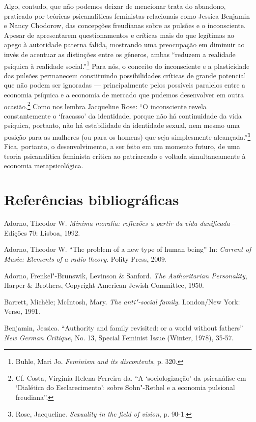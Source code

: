 Algo, contudo, que não podemos deixar de mencionar trata do abandono,
praticado por teóricas psicanalíticas feministas relacionais como
Jessica Benjamin e Nancy Chodorow, das concepções freudianas sobre as
pulsões e o inconsciente. Apesar de apresentarem questionamentos e
críticas mais do que legítimas ao apego à autoridade paterna falida,
mostrando uma preocupação em diminuir ao invés de acentuar as distinções
entre os gêneros, ambas ``reduzem a realidade psíquica à realidade
social.''\footnote{Buhle, Mari Jo. \emph{Feminism and its discontents},
  p. 320.} Para nós, o conceito do inconsciente e a plasticidade das
pulsões permanecem constituindo possibilidades críticas de grande
potencial que não podem ser ignoradas --- principalmente pelos possíveis
paralelos entre a economia psíquica e a economia de mercado que pudemos
desenvolver em outra ocasião.\footnote{Cf. Costa, Virginia Helena
  Ferreira da. ``A `sociologização' da psicanálise em `Dialética do
  Esclarecimento': sobre Sohn"-Rethel e a economia pulsional freudiana''.}
Como nos lembra Jacqueline Rose: ``O inconsciente revela constantemente
o `fracasso' da identidade, porque não há continuidade da vida psíquica,
portanto, não há estabilidade da identidade sexual, nem mesmo uma
posição para as mulheres (ou para os homens) que seja simplesmente
alcançada.''\footnote{Rose, Jacqueline. \emph{Sexuality in the field of
  vision}, p. 90-1.} Fica, portanto, o desenvolvimento, a ser feito em
um momento futuro, de uma teoria psicanalítica feminista crítica ao
patriarcado e voltada simultaneamente à economia metapsicológica.

\section{Referências bibliográficas}

Adorno, Theodor W. \emph{Minima
moralia: reflexões a partir da vida danificada} -- Edições 70: Lisboa,
1992.

Adorno, Theodor W. ``The problem of a new type of human being'' In:
\emph{Current of Music: Elements of a radio theory.} Polity Press, 2009.

Adorno, Frenkel"-Brunswik, Levinson \& Sanford. \emph{The Authoritarian
Personality}, Harper \& Brothers, Copyright American Jewish Committee,
1950.

Barrett, Michèle; McIntosh, Mary. \emph{The anti"-social family}.
London/New York: Verso, 1991.

Benjamin, Jessica. ``Authority and family revisited: or a world
without fathers'' \emph{New German Critique}, No. 13, Special Feminist
Issue (Winter, 1978), 35-57.

